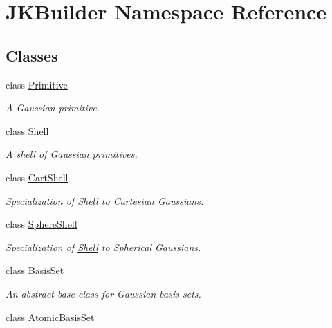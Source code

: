 \hypertarget{namespaceJKBuilder}{
\section{JKBuilder Namespace Reference}
\label{namespaceJKBuilder}
}
\subsection*{Classes}
\begin{DoxyCompactItemize}
\item 
class \hyperlink{classJKBuilder_1_1Primitive}{Primitive}
\begin{DoxyCompactList}\small\item\em A Gaussian primitive. \item\end{DoxyCompactList}\item 
class \hyperlink{classJKBuilder_1_1Shell}{Shell}
\begin{DoxyCompactList}\small\item\em A shell of Gaussian primitives. \item\end{DoxyCompactList}\item 
class \hyperlink{classJKBuilder_1_1CartShell}{CartShell}
\begin{DoxyCompactList}\small\item\em Specialization of \hyperlink{classJKBuilder_1_1Shell}{Shell} to Cartesian Gaussians. \item\end{DoxyCompactList}\item 
class \hyperlink{classJKBuilder_1_1SphereShell}{SphereShell}
\begin{DoxyCompactList}\small\item\em Specialization of \hyperlink{classJKBuilder_1_1Shell}{Shell} to Spherical Gaussians. \item\end{DoxyCompactList}\item 
class \hyperlink{classJKBuilder_1_1BasisSet}{BasisSet}
\begin{DoxyCompactList}\small\item\em An abstract base class for Gaussian basis sets. \item\end{DoxyCompactList}\item 
class \hyperlink{classJKBuilder_1_1AtomicBasisSet}{AtomicBasisSet}
\item 

\end{DoxyCompactItemize}
